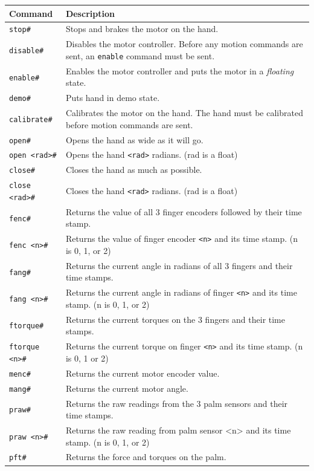 \documentclass[letterpaper,notitlepage,10pt]{article}
\begin{document}
\begin{tabular}{l|p{}}
Command & Description \\
\hline
\verb;stop#; & Stops and brakes the motor on the hand. \\
\verb;disable#; & Disables the motor controller. Before any motion commands are sent, an \verb;enable; command must be sent. \\
\verb;enable#; & Enables the motor controller and puts the motor in a \emph{floating} state. \\
\verb;demo#; & Puts hand in demo state. \\
\verb;calibrate#; & Calibrates the motor on the hand. The hand must be calibrated before motion commands are sent. \\
\verb;open#; & Opens the hand as wide as it will go. \\
\verb;open <rad>#; & Opens the hand \verb;<rad>; radians. (rad is a float)\\
\verb;close#; & Closes the hand as much as possible.\\
\verb;close <rad>#; & Closes the hand \verb;<rad>; radians. (rad is a float)\\
\verb;fenc#; & Returns the value of all 3 finger encoders followed by their time stamp. \\
\verb;fenc <n>#; & Returns the value of finger encoder \verb;<n>; and its time stamp. (n is 0, 1, or 2)\\
\verb;fang#; & Returns the current angle in radians of all 3 fingers and their time stamps. \\
\verb;fang <n>#; & Returns the current angle in radians of finger \verb;<n>; and its time stamp. (n is 0, 1, or 2)\\
\verb;ftorque#; & Returns the current torques on the 3 fingers and their time stamps. \\
\verb;ftorque <n>#; & Returns the current torque on finger \verb;<n>; and its time stamp. (n is 0, 1 or 2)\\
\verb;menc#; & Returns the current motor encoder value. \\
\verb;mang#; & Returns the current motor angle. \\
\verb;praw#; & Returns the raw readings from the 3 palm sensors and their time stamps. \\
\verb;praw <n>#; & Returns the raw reading from palm sensor <n> and its time stamp. (n is 0, 1, or 2)\\
\verb;pft#; & Returns the force and torques on the palm. \\

\end{tabular}
\end{document}
